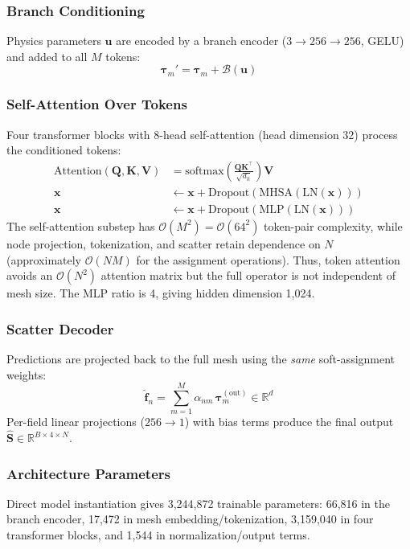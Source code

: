 \documentclass[journal]{IEEEtran}
\newcommand{\added}[1]{#1}
\begin{document}
\subsubsection{Branch Conditioning}
Physics parameters $\bm{u}$ are encoded by a branch encoder ($3 \to 256 \to 256$, GELU) and added to all $M$ tokens:
\begin{equation}
\bm{\tau}_m' = \bm{\tau}_m + \mathcal{B}(\bm{u})
\label{eq:branch_cond}
\end{equation}

\subsubsection{Self-Attention Over Tokens}
Four transformer blocks with 8-head self-attention (head dimension 32) process the conditioned tokens:
\begin{align}
\text{Attention}(\bm{Q},\bm{K},\bm{V}) &= \text{softmax}\!\left(\frac{\bm{Q}\bm{K}^\top}{\sqrt{d_k}}\right)\bm{V} \label{eq:attn} \\
\bm{x} &\leftarrow \bm{x} + \text{Dropout}(\text{MHSA}(\text{LN}(\bm{x}))) \label{eq:res_attn} \\
\bm{x} &\leftarrow \bm{x} + \text{Dropout}(\text{MLP}(\text{LN}(\bm{x}))) \label{eq:res_mlp}
\end{align}
\added{The self-attention substep has $\mathcal{O}(M^2)=\mathcal{O}(64^2)$ token-pair complexity, while node projection, tokenization, and scatter retain dependence on $N$ (approximately $\mathcal{O}(NM)$ for the assignment operations). Thus, token attention avoids an $\mathcal{O}(N^2)$ attention matrix but the full operator is not independent of mesh size.} The MLP ratio is 4, giving hidden dimension 1,024.

\subsubsection{Scatter Decoder}
Predictions are projected back to the full mesh using the \emph{same} soft-assignment weights:
\begin{equation}
\hat{\bm{f}}_n = \sum_{m=1}^{M} \alpha_{nm}\,\bm{\tau}_m^{(\text{out})} \in \mathbb{R}^{d}
\label{eq:scatter}
\end{equation}
Per-field linear projections ($256 \to 1$) with bias terms produce the final output $\hat{\bm{S}} \in \mathbb{R}^{B \times 4 \times N}$.

\subsubsection{Architecture Parameters}
 \added{Direct model instantiation gives 3,244,872 trainable parameters: 66,816 in the branch encoder, 17,472 in mesh embedding/tokenization, 3,159,040 in four transformer blocks, and 1,544 in normalization/output terms.}
\end{document}
